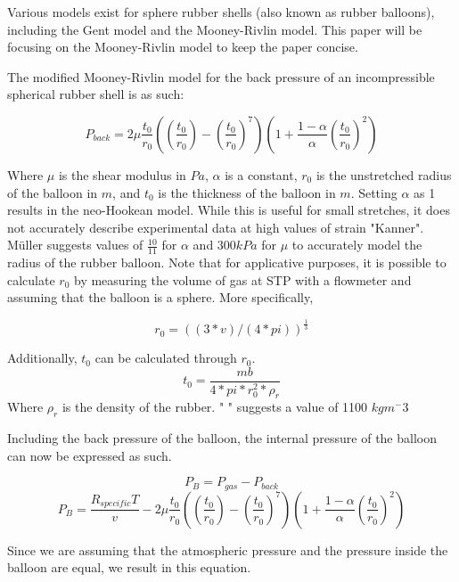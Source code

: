 \documentclass[usenatbib]{mn2e}
\newcommand{\f}[2]{\frac{#1}{#2}}
\begin{document}
Various models exist for sphere rubber shells (also known as rubber balloons), including the Gent model and the Mooney-Rivlin model. This paper will be focusing on the Mooney-Rivlin model to keep the paper concise.

The modified Mooney-Rivlin model for the back pressure of an incompressible spherical rubber shell is as such:

\begin{equation}
P_{back} = 2\mu\frac{t_0}{r_0}((\frac{t_0}{r_0})-(\frac{t_0}{r_0})^7)(1+\frac{1-\alpha}{\alpha}(\frac{t_0}{r_0})^2)
\end{equation}

Where $\mu$ is the shear modulus in $Pa$, $\alpha$ is a constant, $r_0$ is the unstretched radius of the balloon in $m$, and $t_0$ is the thickness of the balloon in $m$. Setting $\alpha$ as 1 results in the neo-Hookean model. While this is useful for small stretches, it does not accurately describe experimental data at high values of strain "Kanner". Müller suggests values of $\f{10}{11}$ for $\alpha$ and $300 kPa$ for $\mu$ to accurately model the radius of the rubber balloon. 
Note that for applicative purposes, it is possible to calculate $r_0$ by measuring the volume of gas at STP with a flowmeter and assuming that the balloon is a sphere. More specifically,

\begin{equation}
	r_0 = ((3*v)/(4*pi))^\frac{1}{3}
\end{equation}

Additionally, $t_0$ can be calculated through $r_0$.
\begin{equation}
	t_0 = \frac{mb}{4*pi*r_0^2*\rho_r}
\end{equation}
Where $\rho_r$ is the density of the rubber. " " suggests a value of 1100 $kgm^-3$

Including the back pressure of the balloon, the internal pressure of the balloon can now be expressed as such.

\begin{equation}
P_B = P_{gas} - P_{back}
\end{equation}
\begin{equation}
P_B = \f{R_{specific}T}{v} - 2\mu\frac{t_0}{r_0}((\frac{t_0}{r_0})-(\frac{t_0}{r_0})^7)(1+\frac{1-\alpha}{\alpha}(\frac{t_0}{r_0})^2)
\end{equation}

Since we are assuming that the atmospheric pressure and the pressure inside the balloon are equal, we result in this equation.
\end{document}
